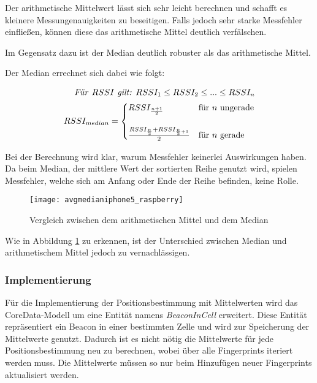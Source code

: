 Der arithmetische Mittelwert lässt sich sehr leicht berechnen und schafft es kleinere Messungenauigkeiten zu beseitigen. Falls jedoch sehr starke Messfehler einfließen, können diese das arithmetische Mittel deutlich verfälschen.

Im Gegensatz dazu ist der Median deutlich robuster als das arithmetische Mittel.

Der Median errechnet sich dabei wie folgt: 

\begin{equation}
	\begin{split}
	\text{\emph{Für }}RSSI \text{\emph{ gilt: }} RSSI_{1} \leq RSSI_{2} \leq ... \leq RSSI_{n} \\
	RSSI_{median}=\begin{cases}
	RSSI_{\frac{n+1}{2}} & \text{für } n \text{ ungerade}\\ \\
	\frac{RSSI_{\frac{n}{2}} + RSSI_{\frac{n}{2}+1}}{2} & \text{für } n \text{ gerade} \\
	\end{cases}
	\end{split}
\end{equation}

Bei der Berechnung wird klar, warum Messfehler keinerlei Auswirkungen haben. Da beim Median, der mittlere Wert der sortierten Reihe genutzt wird, spielen Messfehler, welche sich am Anfang oder Ende der Reihe befinden, keine Rolle.

\begin{figure}[htb!]
		\centering
	\texttt{[image: avgmedianiphone5\_raspberry]}
	\caption{Vergleich zwischen dem arithmetischen Mittel und dem Median}
	\label{avgmedianiphone5_raspberry}
\end{figure}

Wie in Abbildung \ref{avgmedianiphone5_raspberry} zu erkennen, ist der Unterschied zwischen Median und arithmetischem Mittel jedoch zu vernachlässigen. 

\subsubsection{Implementierung}
\label{sec:implementation:fingerprinting:positioning:avg:implementiation}
Für die Implementierung der Positionsbestimmung mit Mittelwerten wird das CoreData-Modell um eine Entität namens \emph{BeaconInCell} erweitert. Diese Entität repräsentiert ein Beacon in einer bestimmten Zelle und wird zur Speicherung der Mittelwerte genutzt. Dadurch ist es nicht nötig die Mittelwerte für jede Positionsbestimmung neu zu berechnen, wobei über alle Fingerprints iteriert werden muss. Die Mittelwerte müssen so nur beim Hinzufügen neuer Fingerprints aktualisiert werden.

